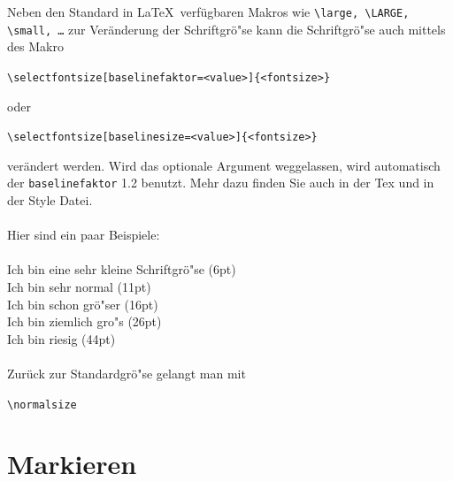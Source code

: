 \noindent Neben den Standard in \LaTeX~verfügbaren Makros wie \texttt{\textbackslash large, \textbackslash LARGE, \textbackslash small, \ldots} zur Veränderung der Schriftgrö"se kann die Schriftgrö"se auch mittels des Makro

\begin{center}
\texttt{\textbackslash selectfontsize[baselinefaktor=<value>]\{<fontsize>\}}
\end{center}

\noindent oder

\begin{center}
\texttt{\textbackslash selectfontsize[baselinesize=<value>]\{<fontsize>\}}
\end{center}

\noindent verändert werden. Wird das optionale Argument weggelassen, wird automatisch der \texttt{baselinefaktor} 1.2 benutzt. Mehr dazu finden Sie auch in der Tex und in der Style Datei.\\
\\
Hier sind ein paar Beispiele:\\
\\
 Ich bin eine sehr kleine Schriftgrö"se (6pt)\\
 Ich bin sehr normal (11pt)\\
 Ich bin schon grö"ser (16pt)\\
 Ich bin ziemlich gro"s (26pt)\\
 Ich bin riesig (44pt)%
%
\normalsize\\
\\
Zurück zur Standardgrö"se gelangt man mit

\begin{center}
\texttt{\textbackslash normalsize}
\end{center}

\newpage



\section{Markieren}



